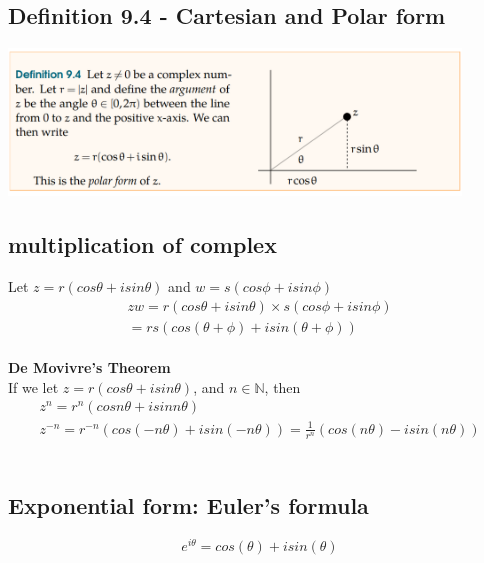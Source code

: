 \documentclass{article}
\theoremstyle{definition}
\theoremstyle{definition}
\theoremstyle{remark}
\begin{document}
\subsection{Definition 9.4 - Cartesian and Polar form}
\begin{center}
    \includegraphics[width=0.9\textwidth]{Definition 9.4}\\
\end{center}

\subsection{multiplication of complex}
Let $z=r(cos \theta +isin \theta)$ and  $w=s(cos \phi + isin\phi)$\\
\begin{equation} 
\begin{aligned}
    zw = r(cos \theta + isin\theta)\times s(cos\phi + isin\phi)\\
    = rs(cos(\theta + \phi)+isin(\theta + \phi))
\end{aligned}
\end{equation}
\\
\textbf{De Movivre's Theorem}\\
If we let $z=r(cos\theta + isin\theta)$, and $n\in \mathbb{N}$, then\\
\begin{equation}
\begin{aligned}
    z^n = r^n(cos n\theta + isin n\theta)\\
    z^{-n} = r^{-n}(cos(-n\theta)+ isin(-n \theta)) = \frac{1}{r^{n}}(cos(n \theta)-isin(n\theta))
\end{aligned}
\end{equation}
\\

\subsection{Exponential form: Euler's formula}
\begin{center}
\begin{equation}
    e^{i \theta} = cos(\theta)+isin(\theta)
\end{equation}
\end{center}
\end{document}
